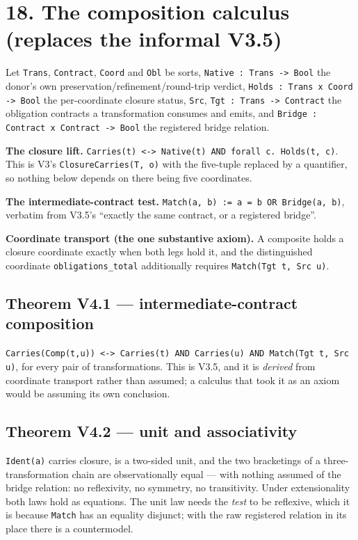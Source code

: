 \section{18. The composition calculus (replaces the informal V3.5)}

Let \texttt{Trans}, \texttt{Contract}, \texttt{Coord} and \texttt{Obl} be sorts,
\texttt{Native : Trans -> Bool} the
donor's own preservation/refinement/round-trip verdict,
\texttt{Holds : Trans x Coord -> Bool} the per-coordinate closure status,
\texttt{Src}, \texttt{Tgt : Trans -> Contract} the
obligation contracts a transformation consumes and emits, and
\texttt{Bridge : Contract x Contract -> Bool} the registered bridge relation.

\textbf{The closure lift.} \texttt{Carries(t) <-> Native(t) AND forall c. Holds(t, c)}. This
is V3's \texttt{ClosureCarries(T, o)} with the five-tuple replaced by a quantifier, so
nothing below depends on there being five coordinates.

\textbf{The intermediate-contract test.} \texttt{Match(a, b) := a = b OR Bridge(a, b)},
verbatim from V3.5's ``exactly the same contract, or a registered bridge''.

\textbf{Coordinate transport (the one substantive axiom).} A composite holds a closure
coordinate exactly when both legs hold it, and the distinguished coordinate
\texttt{obligations_total} additionally requires \texttt{Match(Tgt t, Src u)}.

\subsection{Theorem V4.1 --- intermediate-contract composition}

\texttt{Carries(Comp(t,u)) <-> Carries(t) AND Carries(u) AND Match(Tgt t, Src u)}, for
every pair of transformations. This is V3.5, and it is \emph{derived} from coordinate
transport rather than assumed; a calculus that took it as an axiom would be
assuming its own conclusion.

\subsection{Theorem V4.2 --- unit and associativity}

\texttt{Ident(a)} carries closure, is a two-sided unit, and the two bracketings of a
three-transformation chain are observationally equal --- with nothing assumed of
the bridge relation: no reflexivity, no symmetry, no transitivity. Under
extensionality both laws hold as equations. The unit law needs the \emph{test} to be
reflexive, which it is because \texttt{Match} has an equality disjunct; with the raw
registered relation in its place there is a countermodel.

